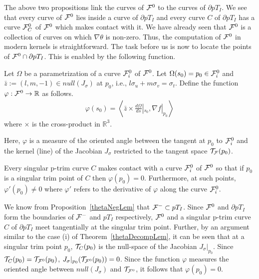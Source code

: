 \documentclass{elsart5p}
\begin{document}
The above two propositions link the curves of ${\cal F}^0$ to the curves of $\partial pT_I$.
We see that every curve of ${\cal F}^0$ lies inside a curve of $\partial pT_I$ and 
every curve $C$ of $\partial pT_I$ has a curve ${\cal F}^0_C$ of ${\cal F}^0$ 
which makes contact with it.  We have already seen that ${\cal F}^0$ is a collection of curves 
on which $\nabla \theta$ is non-zero.  Thus, the computation of ${\cal F}^0$ in modern 
kernels is straightforward. The task before us is now to locate the points of 
${\cal F}^0 \cap \partial pT_I$. This is enabled by the following function.

\begin{defn}  \label{omegaDef}
Let $\Omega$ be a parametrization of a curve ${\cal F}^0_i$ of ${\cal F}^0$.  
Let $\Omega(s_0) = p_0 \in {\cal F}^0_i$ and  $\bar{z} :=(l,m,-1) \in null(J_{\sigma})$ 
at $p_0$, i.e., $l \sigma_u + m \sigma_v = \sigma_t$.   Define the function 
$\varphi :{\cal F}^0 \to \mathbb{R}$ as follows.
\begin{align}
\varphi(s_0) = \left < \bar{z} \times \frac{d \Omega}{d s}|_{s_0}    , \nabla f|_{p_0} \right >
\end{align}
where $\times$ is the cross-product in $\mathbb{R}^3$.
\end{defn}
 Here, $\varphi$ is a measure of the oriented angle between the tangent at $p_0$ to ${\cal F}^0_i$ 
and the kernel  (line) of the Jacobian $J_{\sigma}$ restricted to the tangent space ${\cal T}_{\cal F}(p_0)$.

\begin{prop} \label{omegaProp}
Every singular p-trim curve $C$ makes contact with a curve ${\cal F}^0_i$ of ${\cal F}^0$ 
so that if
$p_0$ is a singular trim point of $C$ then $\varphi(p_0) = 0$.  Furthermore, at 
such points, $\varphi '(p_0) \neq 0$ where $\varphi '$ refers to the derivative of $\varphi$ 
along the curve ${\cal F}^0_i$.
\end{prop}
 We know from Proposition~\ref{thetaNegLem} that ${\cal F}^- \subset pT_I$.  
Since ${\cal F}^0$ and $\partial pT_I$ form the boundaries of ${\cal F}^-$ and $pT_I$ respectively, 
${\cal F}^0$ and a singular p-trim curve $C$ of $\partial pT_I$ meet tangentially at the singular trim point.
Further, by an argument similar to the case (i) of Theorem~\ref{thetaDecompLem}, it can be seen that 
at a singular trim point $p_0$, 
${\cal T}_{C}(p_0)$ is the null-space of the Jacobian $J_{\sigma}|_{p_0}$.  Since 
${\cal T}_{C}(p_0) = {\cal T}_{{\cal F}^0}(p_0)$, $J_{\sigma}|_{p_0}({\cal T}_{{\cal F}^0}(p_0)) = 0$.  
Since the function $\varphi$ measures the oriented angle between $null(J_{\sigma})$ and ${\cal T}_{{\cal F}^0}$, 
it follows that $\varphi(p_0) = 0$.
\end{document}
